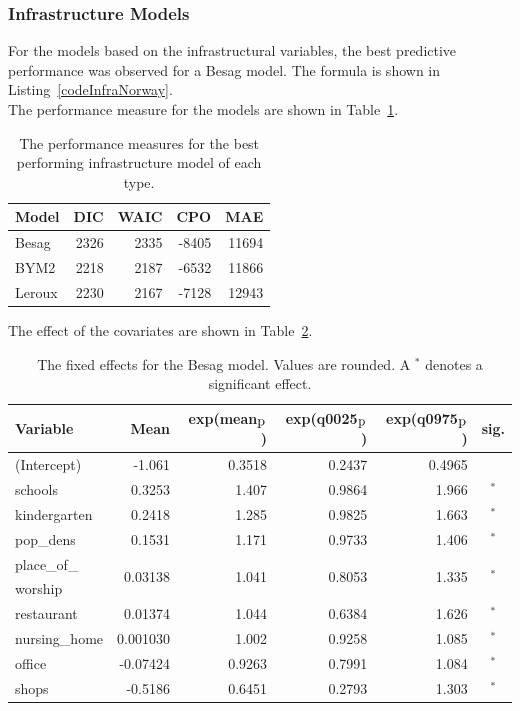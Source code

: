\subsubsection{Infrastructure Models}
For the models based on the infrastructural variables, the best predictive performance was observed for a Besag model. The formula is shown in Listing~\ref{codeInfraNorway}. \\
The performance measure for the models are shown in Table~\ref{infraNorway}.
\begin{table}[H] 
\caption{The performance measures for the best performing infrastructure model of each type. \label{infraNorway}}
\begin{tabular}{l r r r r}
\toprule
\textbf{Model}	& \textbf{DIC}	& \textbf{WAIC} & \textbf{CPO} & \textbf{MAE} \\
\midrule
Besag  & 2326 & 2335 & -8405 & 11694 \\
BYM2 & 2218 & 2187 & -6532 & 11866\\
Leroux &  2230 & 2167 & -7128 & 12943\\
\bottomrule
\end{tabular}
\end{table}
The effect of the covariates are shown in Table~\ref{fixedInfraNorway}.
\begin{table}[H] 
\caption{The fixed effects for the Besag model. Values are rounded. A $^*$ denotes a significant effect.\label{fixedInfraNorway}}
\begin{tabular}{l r r r r c}
\toprule
\textbf{Variable}	& \textbf{Mean}	& \textbf{exp(mean$_{\hbox{p}}$)} & \textbf{exp(q0025$_{\hbox{p}}$)} & \textbf{exp(q0975$_{\hbox{p}}$)} & \textbf{sig.}\\
\midrule
(Intercept) & -1.061 & 0.3518 & 0.2437 & 0.4965 &\\
schools & 0.3253 & 1.407 & 0.9864 & 1.966 & $^*$\\
kindergarten & 0.2418 & 1.285 & 0.9825 & 1.663 & $^*$\\
pop\_dens & 0.1531 & 1.171 &  0.9733  & 1.406& $^*$\\
place\_of\_ & \multirow{2}{*}{0.03138} & \multirow{2}{*}{1.041} & \multirow{2}{*}{0.8053} & \multirow{2}{*}{1.335} & \multirow{2}{*}{$^*$}\\
worship\\
restaurant & 0.01374 & 1.044 & 0.6384 & 1.626 & $^*$\\
nursing\_home & 0.001030 & 1.002 & 0.9258 & 1.085& $^*$\\
office & -0.07424 & 0.9263 &  0.7991 & 1.084 & $^*$\\
shops & -0.5186 &0.6451 & 0.2793 & 1.303 & $^*$\\
\bottomrule
\end{tabular}
\end{table}
